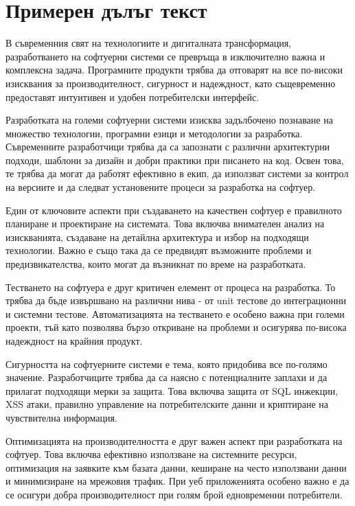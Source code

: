 \section{Примерен дълъг текст}

В съвременния свят на технологиите и дигиталната трансформация, разработването на софтуерни системи се превръща в изключително важна и комплексна задача. Програмните продукти трябва да отговарят на все по-високи изисквания за производителност, сигурност и надеждност, като същевременно предоставят интуитивен и удобен потребителски интерфейс.

Разработката на големи софтуерни системи изисква задълбочено познаване на множество технологии, програмни езици и методологии за разработка. Съвременните разработчици трябва да са запознати с различни архитектурни подходи, шаблони за дизайн и добри практики при писането на код. Освен това, те трябва да могат да работят ефективно в екип, да използват системи за контрол на версиите и да следват установените процеси за разработка на софтуер.

Един от ключовите аспекти при създаването на качествен софтуер е правилното планиране и проектиране на системата. Това включва внимателен анализ на изискванията, създаване на детайлна архитектура и избор на подходящи технологии. Важно е също така да се предвидят възможните проблеми и предизвикателства, които могат да възникнат по време на разработката.

Тестването на софтуера е друг критичен елемент от процеса на разработка. То трябва да бъде извършвано на различни нива - от unit тестове до интеграционни и системни тестове. Автоматизацията на тестването е особено важна при големи проекти, тъй като позволява бързо откриване на проблеми и осигурява по-висока надеждност на крайния продукт.

Сигурността на софтуерните системи е тема, която придобива все по-голямо значение. Разработчиците трябва да са наясно с потенциалните заплахи и да прилагат подходящи мерки за защита. Това включва защита от SQL инжекции, XSS атаки, правилно управление на потребителските данни и криптиране на чувствителна информация.

Оптимизацията на производителността е друг важен аспект при разработката на софтуер. Това включва ефективно използване на системните ресурси, оптимизация на заявките към базата данни, кеширане на често използвани данни и минимизиране на мрежовия трафик. При уеб приложенията особено важно е да се осигури добра производителност при голям брой едновременни потребители.

